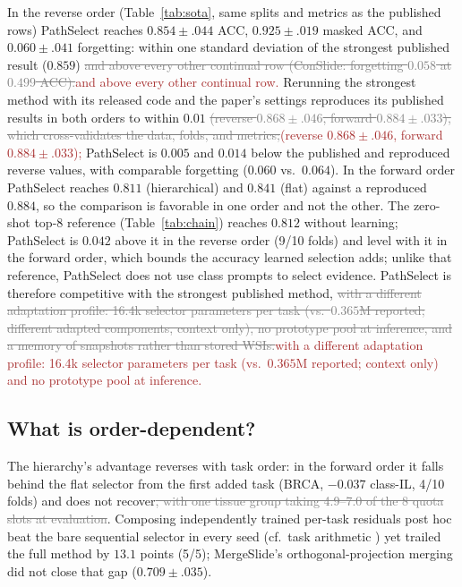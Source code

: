 \documentclass{article}
\newif\ifmarkup \markuptrue
\newcommand{\repc}[3]{\ifmarkup\textcolor{gray}{\sout{#2}}\textcolor{#1}{#3}\else#3\fi}
\newcommand{\repB}[2]{\repc{brown}{#1}{#2}}   %
\begin{document}
In the reverse order (Table~\ref{tab:sota}, same splits and metrics as the published rows) PathSelect reaches $0.854{\pm}.044$ ACC, $0.925{\pm}.019$ masked ACC, and $0.060{\pm}.041$ forgetting: within one standard deviation of the strongest published result ($0.859$) \repB{and above every other continual row (ConSlide: forgetting $0.058$ at $0.499$ ACC).}{and above every other continual row.} Rerunning the strongest method with its released code and the paper's settings reproduces its published results in both orders to within $0.01$ \repB{(reverse $0.868{\pm}.046$, forward $0.884{\pm}.033$), which cross-validates the data, folds, and metrics;}{(reverse $0.868{\pm}.046$, forward $0.884{\pm}.033$);} PathSelect is $0.005$ and $0.014$ below the published and reproduced reverse values, with comparable forgetting ($0.060$ vs.\ $0.064$). In the forward order PathSelect reaches $0.811$ (hierarchical) and $0.841$ (flat) against a reproduced $0.884$, so the comparison is favorable in one order and not the other. The zero-shot top-8 reference (Table~\ref{tab:chain}) reaches $0.812$ without learning; PathSelect is $0.042$ above it in the reverse order (9/10 folds) and level with it in the forward order, which bounds the accuracy learned selection adds; unlike that reference, PathSelect does not use class prompts to select evidence. PathSelect is therefore competitive with the strongest published method, \repB{with a different adaptation profile: 16.4k selector parameters per task (vs.\ $0.365$M reported; different adapted components, context only), no prototype pool at inference, and a memory of snapshots rather than stored WSIs.}{with a different adaptation profile: 16.4k selector parameters per task (vs.\ $0.365$M reported; context only) and no prototype pool at inference.}

\subsection{What is order-dependent?}
\label{ssec:order}

The hierarchy's advantage reverses with task order: in the forward order it falls behind the flat selector from the first added task (BRCA, $-0.037$ class-IL, 4/10 folds) and does not recover\repB{, with one tissue group taking 4.9--7.0 of the 8 quota slots at evaluation}{}. Composing independently trained per-task residuals post hoc beat the bare sequential selector in every seed (cf.\ task arithmetic \cite{ilharco2023task}) yet trailed the full method by $13.1$ points (5/5); MergeSlide's orthogonal-projection merging \cite{bui2026mergeslide} did not close that gap ($0.709{\pm}.035$).
\end{document}
